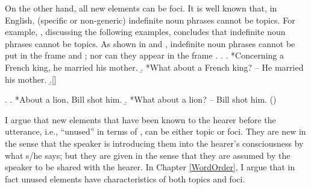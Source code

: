 On the other hand,
all new elements can be foci.
It is well known that, in English, (specific or non-generic) indefinite noun phrases cannot be topics.
For example, , discussing the following examples,
concludes that indefinite noun phrases cannot be topics.
As shown in \Next[a] and \NNext[a],
indefinite noun phrases cannot be put in the frame  and ;
nor can they appear in the frame .
%
\ex. 
  \a. *Concerning a French king, he married his mother.
  \b. *What about a French king? -- He married his mother.
  \b.[] \hfill{\cite[54]{gundel74}}

\ex.
  \a. *About a lion, Bill shot him.
  \b. *What about a lion? -- Bill shot him.
     \hfill{()}


I argue that new elements that have been known to the hearer before the utterance, i.e., ``unused'' in terms of , can be either topic or foci.
They are new in the sense that the speaker is introducing them into the hearer's consciousness by what s/he says;
but they are given in the sense that they are assumed by the speaker to be shared with the hearer.
In Chapter \ref{WordOrder},
I argue that in fact unused elements have characteristics of both topics and foci.
%




